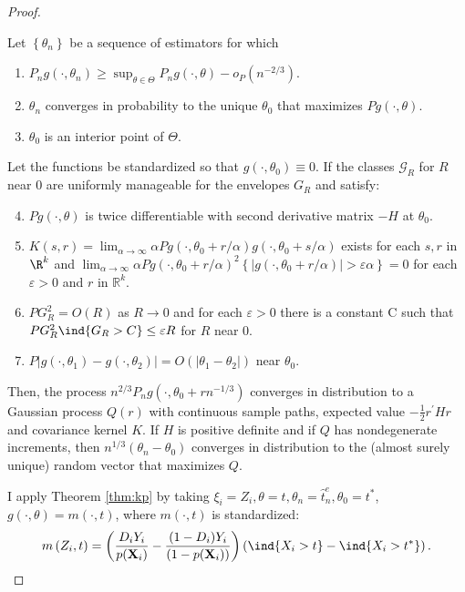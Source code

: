{\begin{proof}
\begin{thmkp}
Let $\left\{\theta_n\right\}$ be a sequence of estimators for which
\begin{enumerate}
    \item $P_n g\left(\cdot, \theta_n\right) \geq \sup _{\theta \in \Theta} P_n g(\cdot, \theta)-o_P\left(n^{-2 / 3}\right)$.
    \item $\theta_n$ converges in probability to the unique $\theta_0$ that maximizes $P g(\cdot, \theta)$.
    \item $\theta_0$ is an interior point of $\Theta$.
\end{enumerate}
Let the functions be standardized so that $g\left(\cdot, \theta_0\right) \equiv 0$. If the classes $\mathcal{G}_R$ for $R$ near 0 are uniformly manageable for the envelopes $G_R$ and satisfy:
\begin{enumerate} \setcounter{enumi}{3}
    \item $P g(\cdot, \theta)$ is twice differentiable with second derivative matrix $-H$ at $\theta_0$.
    \item $K(s, r)=\lim _{\alpha \rightarrow \infty} \alpha P g\left(\cdot, \theta_0+r / \alpha\right) g\left(\cdot, \theta_0+s / \alpha\right)$ exists for each $s, r$ in $\R^k$ and $\lim _{\alpha \rightarrow \infty} \alpha P g\left(\cdot, \theta_0+r / \alpha\right)^2\left\{\left|g\left(\cdot, \theta_0+r / \alpha\right)\right|>\varepsilon \alpha\right\}=0$ for each $\varepsilon>0$ and $r$ in $\mathbb{R}^k$.
    \item $PG_R^2 = O(R)$ as $R\rightarrow 0$ and for each $\varepsilon>0$ there is a constant C such that $PG_R^2 \ind\{G_R > C\} \leq \varepsilon R$ for $R$ near 0.
    \item $P\left|g\left(\cdot, \theta_1\right)-g\left(\cdot, \theta_2\right)\right|=O\left(\left|\theta_1-\theta_2\right|\right)$ near $\theta_0$.
\end{enumerate}
Then, the process $n^{2 / 3} P_n g\left(\cdot, \theta_0+r n^{-1 / 3}\right)$ converges in distribution to a Gaussian process $Q(r)$ with continuous sample paths, expected value $-\frac{1}{2} r^{\prime} H r$ and covariance kernel $K$. If $H$ is positive definite and if $Q$ has nondegenerate increments, then $n^{1 / 3}\left(\theta_n-\theta_0\right)$ converges in distribution to the (almost surely unique) random vector that maximizes $Q$.
\end{thmkp}

I apply Theorem \ref{thm:kp} by taking $\xi_i=Z_i, \theta=t, \theta_n=\hat{t}^e_n, \theta_0=t^*$, $g(\cdot, \theta) = m(\cdot,t)$, where $m(\cdot,t)$ is standardized:
\begin{gather}
    m\left(Z_i, t\right)=\left(\frac{D_i Y_i}{p(\textbf{X}_i)} - \frac{(1-D_i) Y_i}{(1-p(\textbf{X}_i))} \right) \left(\ind\{X_i > t\} - \ind\{X_i > t^*\} \right).
\end{gather}


\end{proof}}

